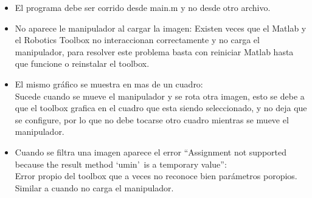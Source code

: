 \begin{itemize}
	\item El programa debe ser corrido desde main.m y no desde otro archivo.
	\item No aparece le manipulador al cargar la imagen:
Existen veces que el Matlab y el Robotics Toolbox no interaccionan correctamente y no carga el manipulador, para resolver este problema basta con reiniciar Matlab hasta que funcione o reinstalar el toolbox.
	\item El mismo gráfico se muestra en mas de un cuadro:\\
Sucede cuando se mueve el manipulador y se rota otra imagen, esto se debe a que el toolbox grafica en el cuadro que esta siendo seleccionado, y no deja que se configure, por lo que no debe tocarse otro cuadro mientras se mueve el manipulador.
	\item Cuando se filtra una imagen aparece el error ``Assignment not supported because the result method `umin'\, is a temporary value'':\\
Error propio del toolbox que a veces no reconoce bien parámetros poropios. Similar a cuando no carga el manipulador.
\end{itemize}

